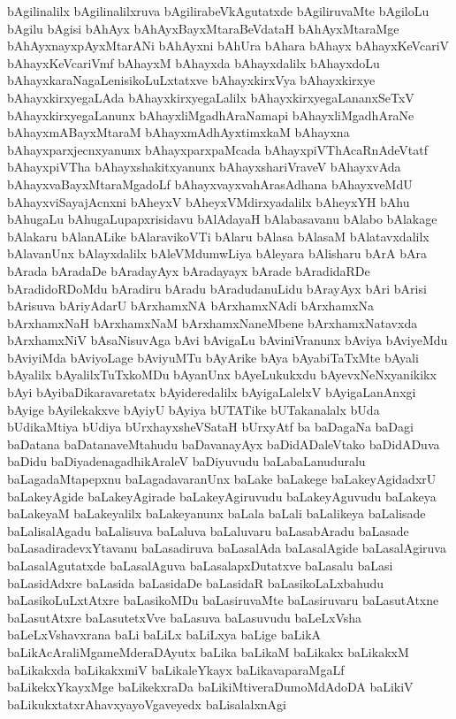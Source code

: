 {bAgilinalilx
bAgilinalilxruva
bAgilirabeVkAgutatxde
bAgiliruvaMte
bAgiloLu
bAgilu
bAgisi
bAhAyx
bAhAyxBayxMtaraBeVdataH
bAhAyxMtaraMge
bAhAyxnayxpAyxMtarANi
bAhAyxni
bAhUra
bAhara
bAhayx
bAhayxKeVcariV
bAhayxKeVcariVmf
bAhayxM
bAhayxda
bAhayxdalilx
bAhayxdoLu
bAhayxkaraNagaLenisikoLuLxtatxve
bAhayxkirxVya
bAhayxkirxye
bAhayxkirxyegaLAda
bAhayxkirxyegaLalilx
bAhayxkirxyegaLananxSeTxV
bAhayxkirxyegaLanunx
bAhayxliMgadhAraNamapi
bAhayxliMgadhAraNe
bAhayxmABayxMtaraM
bAhayxmAdhAyxtimxkaM
bAhayxna
bAhayxparxjecnxyanunx
bAhayxparxpaMcada
bAhayxpiVThAcaRnAdeVtatf
bAhayxpiVTha
bAhayxshakitxyanunx
bAhayxshariVraveV
bAhayxvAda
bAhayxvaBayxMtaraMgadoLf
bAhayxvayxvahArasAdhana
bAhayxveMdU
bAhayxviSayajAcnxni
bAheyxV
bAheyxVMdirxyadalilx
bAheyxYH
bAhu
bAhugaLu
bAhugaLupapxrisidavu
bAlAdayaH
bAlabasavanu
bAlabo
bAlakage
bAlakaru
bAlanALike
bAlaravikoVTi
bAlaru
bAlasa
bAlasaM
bAlatavxdalilx
bAlavanUnx
bAlayxdalilx
bAleVMdumwLiya
bAleyara
bAlisharu
bArA
bAra
bArada
bAradaDe
bAradayAyx
bAradayayx
bArade
bAradidaRDe
bAradidoRDoMdu
bAradiru
bAradu
bAradudanuLidu
bArayAyx
bAri
bArisi
bArisuva
bAriyAdarU
bArxhamxNA
bArxhamxNAdi
bArxhamxNa
bArxhamxNaH
bArxhamxNaM
bArxhamxNaneMbene
bArxhamxNatavxda
bArxhamxNiV
bAsaNisuvAga
bAvi
bAvigaLu
bAviniVranunx
bAviya
bAviyeMdu
bAviyiMda
bAviyoLage
bAviyuMTu
bAyArike
bAya
bAyabiTaTxMte
bAyali
bAyalilx
bAyalilxTuTxkoMDu
bAyanUnx
bAyeLukukxdu
bAyevxNeNxyanikikx
bAyi
bAyibaDikaravaretatx
bAyideredalilx
bAyigaLalelxV
bAyigaLanAnxgi
bAyige
bAyilekakxve
bAyiyU
bAyiya
bUTATike
bUTakanalalx
bUda
bUdikaMtiya
bUdiya
bUrxhayxsheVSataH
bUrxyAtf
ba
baDagaNa
baDagi
baDatana
baDatanaveMtahudu
baDavanayAyx
baDidADaleVtako
baDidADuva
baDidu
baDiyadenagadhikAraleV
baDiyuvudu
baLabaLanuduralu
baLagadaMtapepxnu
baLagadavaranUnx
baLake
baLakege
baLakeyAgidadxrU
baLakeyAgide
baLakeyAgirade
baLakeyAgiruvudu
baLakeyAguvudu
baLakeya
baLakeyaM
baLakeyalilx
baLakeyanunx
baLala
baLali
baLalikeya
baLalisade
baLalisalAgadu
baLalisuva
baLaluva
baLaluvaru
baLasabAradu
baLasade
baLasadiradevxYtavanu
baLasadiruva
baLasalAda
baLasalAgide
baLasalAgiruva
baLasalAgutatxde
baLasalAguva
baLasalapxDutatxve
baLasalu
baLasi
baLasidAdxre
baLasida
baLasidaDe
baLasidaR
baLasikoLaLxbahudu
baLasikoLuLxtAtxre
baLasikoMDu
baLasiruvaMte
baLasiruvaru
baLasutAtxne
baLasutAtxre
baLasutetxVve
baLasuva
baLasuvudu
baLeLxVsha
baLeLxVshavxrana
baLi
baLiLx
baLiLxya
baLige
baLikA
baLikAcAraliMgameMderaDAyutx
baLika
baLikaM
baLikakx
baLikakxM
baLikakxda
baLikakxmiV
baLikaleYkayx
baLikavaparaMgaLf
baLikekxYkayxMge
baLikekxraDa
baLikiMtiveraDumoMdAdoDA
baLikiV
baLikukxtatxrAhavxyayoVgaveyedx
baLisalalxnAgi
}
